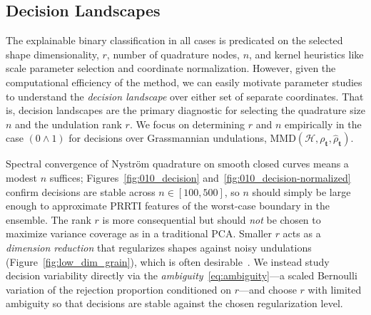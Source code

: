 \documentclass[pdflatex,iicol]{sn-jnl}%
\theoremstyle{thmstyleone}%
\theoremstyle{thmstyletwo}%
\theoremstyle{thmstylethree}%
\begin{document}
\subsection{Decision Landscapes}
The explainable binary classification in all cases is predicated on the selected shape dimensionality, $r$, number of quadrature nodes, $n$, and kernel heuristics like scale parameter selection and coordinate normalization. However, given the computational efficiency of the method, we can easily motivate parameter studies to understand the \textit{decision landscape} over either set of separate coordinates. That is, decision landscapes are the primary diagnostic for selecting the quadrature size $n$ and the undulation rank $r$. We focus on determining $r$ and $n$ empirically in the case $(0 \wedge 1)$ for decisions over Grassmannian undulations, $\text{MMD}(\mathcal{H},\rho_{\boldsymbol{t}},\widehat{\rho}_{\boldsymbol{t}}) $.

Spectral convergence of Nystr\"om quadrature on smooth closed curves means a modest $n$ suffices; Figures~\ref{fig:010_decision} and~\ref{fig:010_decision-normalized} confirm decisions are stable across $n\in[100,500]$, so $n$ should simply be large enough to approximate PRRTI features of the worst-case boundary in the ensemble. The rank $r$ is more consequential but should \emph{not} be chosen to maximize variance coverage as in a traditional PCA. Smaller $r$ acts as a \textit{dimension reduction} that regularizes shapes against noisy undulations (Figure~\ref{fig:low_dim_grain}), which is often desirable~\cite{doronina2025aerodynamic}. We instead study decision variability directly via the \emph{ambiguity}~\eqref{eq:ambiguity}---a scaled Bernoulli variation of the rejection proportion conditioned on $r$---and choose $r$ with limited ambiguity so that decisions are stable against the chosen regularization level.
\end{document}
